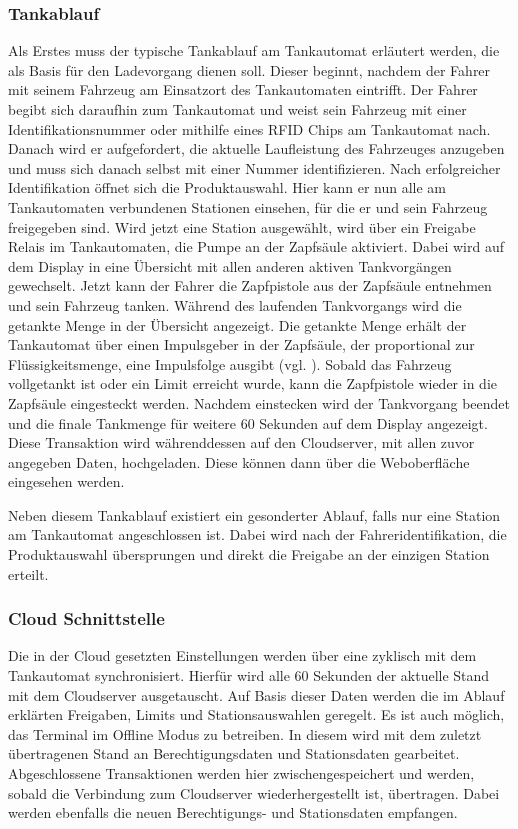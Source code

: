 \subsubsection{Tankablauf}
Als Erstes muss der typische Tankablauf am Tankautomat erläutert werden, die als Basis für den Ladevorgang dienen soll. Dieser beginnt, nachdem der Fahrer mit seinem Fahrzeug am Einsatzort des Tankautomaten eintrifft. Der Fahrer begibt sich daraufhin zum Tankautomat und weist sein Fahrzeug mit einer Identifikationsnummer oder mithilfe eines \acs{RFID} Chips am Tankautomat nach. Danach wird er aufgefordert, die aktuelle Laufleistung des Fahrzeuges anzugeben und muss sich danach selbst mit einer Nummer identifizieren. Nach erfolgreicher Identifikation öffnet sich die Produktauswahl. Hier kann er nun alle am Tankautomaten verbundenen Stationen einsehen, für die er und sein Fahrzeug freigegeben sind. Wird jetzt eine Station ausgewählt, wird über ein Freigabe Relais im Tankautomaten, die Pumpe an der Zapfsäule aktiviert. Dabei wird auf dem Display in eine Übersicht mit allen anderen aktiven Tankvorgängen gewechselt. Jetzt kann der Fahrer die Zapfpistole aus der Zapfsäule entnehmen und sein Fahrzeug tanken. Während des laufenden Tankvorgangs wird die getankte Menge in der Übersicht angezeigt. Die getankte Menge erhält der Tankautomat über einen Impulsgeber in der Zapfsäule, der proportional zur Flüssigkeitsmenge, eine Impulsfolge ausgibt (vgl. \cite{Patent_Zapfsauele}). Sobald das Fahrzeug vollgetankt ist oder ein Limit erreicht wurde, kann die Zapfpistole wieder in die Zapfsäule eingesteckt werden. Nachdem einstecken wird der Tankvorgang beendet und die finale Tankmenge für weitere 60 Sekunden auf dem Display angezeigt. Diese Transaktion wird währenddessen auf den Cloudserver, mit allen zuvor angegeben Daten, hochgeladen. Diese können dann über die Weboberfläche eingesehen werden.\newline

\noindent Neben diesem Tankablauf existiert ein gesonderter Ablauf, falls nur eine Station am Tankautomat angeschlossen ist. Dabei wird nach der Fahreridentifikation, die Produktauswahl übersprungen und direkt die Freigabe an der einzigen Station erteilt.

\subsubsection{Cloud Schnittstelle}
Die in der Cloud gesetzten Einstellungen werden über eine  zyklisch mit dem Tankautomat synchronisiert. Hierfür wird alle 60 Sekunden der aktuelle Stand mit dem Cloudserver ausgetauscht. Auf Basis dieser Daten werden die im Ablauf erklärten Freigaben, Limits und Stationsauswahlen geregelt. Es ist auch möglich, das Terminal im Offline Modus zu betreiben. In diesem wird mit dem zuletzt übertragenen Stand an Berechtigungsdaten und Stationsdaten gearbeitet. Abgeschlossene Transaktionen werden hier zwischengespeichert und werden, sobald die Verbindung zum Cloudserver wiederhergestellt ist, übertragen. Dabei werden ebenfalls die neuen Berechtigungs- und Stationsdaten empfangen.


